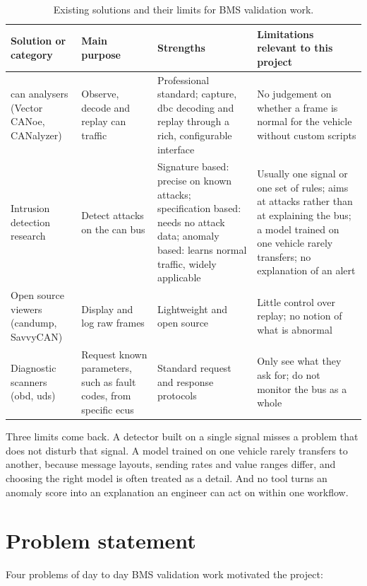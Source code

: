 \begin{table}[H]
\centering
\small
\caption{Existing solutions and their limits for BMS validation work.}
\label{tab:existing-comparison}
\begin{tabularx}{\textwidth}{|P{2.9cm}|P{2.9cm}|Y|Y|}
\hline
\textbf{Solution or category} & \textbf{Main purpose} & \textbf{Strengths} & \textbf{Limitations relevant to this project} \\
\hline
\gls{can} analysers (Vector CANoe, CANalyzer) & Observe, decode and replay \gls{can} traffic & Professional standard; capture, \gls{dbc} decoding and replay through a rich, configurable interface & No judgement on whether a frame is normal for the vehicle without custom scripts \\
\hline
Intrusion detection research & Detect attacks on the \gls{can} bus & Signature based: precise on known attacks; specification based: needs no attack data; anomaly based: learns normal traffic, widely applicable & Usually one signal or one set of rules; aims at attacks rather than at explaining the bus; a model trained on one vehicle rarely transfers; no explanation of an alert \\
\hline
Open source viewers (candump, SavvyCAN) & Display and log raw frames & Lightweight and open source & Little control over replay; no notion of what is abnormal \\
\hline
Diagnostic scanners (\gls{obd}, \gls{uds}) & Request known parameters, such as fault codes, from specific \glspl{ecu} & Standard request and response protocols & Only see what they ask for; do not monitor the bus as a whole \\
\hline
\end{tabularx}
\end{table}

Three limits come back. A detector built on a single signal misses a problem that does not disturb that signal. A model trained on one vehicle rarely transfers to another, because message layouts, sending rates and value ranges differ, and choosing the right model is often treated as a detail. And no tool turns an anomaly score into an explanation an engineer can act on within one workflow.

\section{Problem statement}

Four problems of day to day BMS validation work motivated the project:

